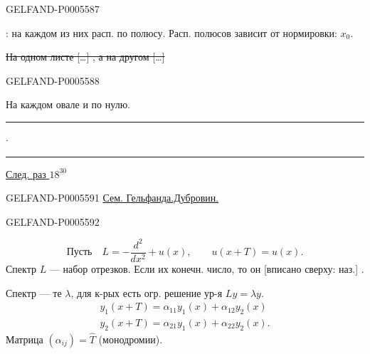 \begin{GelfandAdjacentEvidence}{GELFAND-P000558}{7}


: на каждом из них расп. по полюсу. Расп. полюсов зависит от нормировки: \(x_0\).

\sout{На одном листе […] , а на другом […]}
\end{GelfandAdjacentEvidence}
\begin{GelfandAdjacentEvidence}{GELFAND-P000558}{8}

\end{GelfandAdjacentEvidence}

На каждом овале и по нулю.
\hfill\rule{1.4cm}{.35pt}\enspace\(\cdot\)\enspace\rule{1.4cm}{.35pt}\par
\uline{След. раз \mbox{$18^{\underline{30}}$}}


\begin{GelfandAdjacentEvidence}{GELFAND-P000559}{1}
\noindent{}\qquad\underline{Сем. Гельфанда.}\qquad\underline{Дубровин.}
\end{GelfandAdjacentEvidence}
\begin{GelfandAdjacentEvidence}{GELFAND-P000559}{2}

\[
\text{Пусть}\quad L=-\frac{d^2}{dx^2}+u(x),\qquad u(x+T)=u(x).
\]
Спектр \(L\) — набор отрезков. Если их конечн. число, то он [вписано сверху: наз.] .
\end{GelfandAdjacentEvidence}

Спектр — те \(\lambda\), для к-рых есть огр. решение ур-я \underline{\(Ly=\lambda y\)}.
\begin{gather*}
y_1(x+T)=\alpha_{11}y_1(x)+\alpha_{12}y_2(x)\\
y_2(x+T)=\alpha_{21}y_1(x)+\alpha_{22}y_2(x).
\end{gather*}
Матрица \((\alpha_{ij})=\widehat T\) (монодромии).

